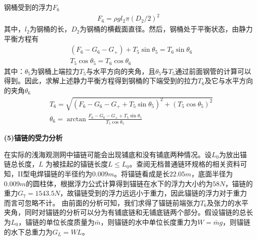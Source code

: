 \documentclass[UTF8]{ctexbook}
\theoremstyle{nonumberplain}
\begin{document}
            \par
            钢桶受到的浮力$F_6$
            \begin{align*}
            F_6 = \rho g l_2 \pi ( {D_2}/{2} ) ^2
            \end{align*}
            其中，$l_2$为钢桶的长，$D_2$为钢桶的横截面直径。然后，钢桶处于平衡状态，由静力平衡方程有
            \begin{align*}
            & (F_6 - G_6 - G_+) +T_5\sin \theta_5 = T_6\sin  \theta_6\\
            & T_5\cos\theta_5 = T_6\cos \theta_6
            \end{align*}
            其中：$\theta_5$为钢桶上端拉力$T_5$与水平方向的夹角，且$\theta_5$与$T_5$通过前面钢管的计算可以得到。因此，求解上述静力平衡方程得到钢桶的下端受到的拉力$T_6$及它与水平方向的夹角$\theta_6$
            \begin{align*}
            & T_6 = \sqrt{(F_6 - G_6 -G_+ +T_5\sin \theta_5)^2+(T_5\cos\theta_5)^2}\\
            & \theta_6 = \arctan \frac{F_6-G_6 - G_++T_5\sin \theta_5}{T_5\cos \theta_5}
            \end{align*}
            \par
            \textbf{(5)锚链的受力分析}
            \par
            在实际的浅海观测网中锚链可能会出现铺底和没有铺底两种情况。设$L_0$为放出锚链总长度，$L$ 为被挂起的锚链长度$L \leqslant L_0$。查阅无档普通链环规格的相关资料可知，II型电焊锚链的半径约为$0.009m$。将锚链看成是长$22.05m$，底面半径为$0.009m$的圆柱体，根据浮力公式计算得到锚链在水下的浮力大小约为$58N$，锚链的重力$G_7 = 1543.5N$，故锚链受到的浮力远远小于重力，因此锚链的浮力对于重力而言可忽略不计。
            由前面的分析可知，我们求得了锚链前端张力$T_6$及张力的水平夹角，同时对锚链的分析可以分为有铺底链和无铺底链两个部分。假设锚链的总长为$L_0$，锚链的单位长度质量为$\bar{m}$，则锚链的水中单位长度重力为$W = \bar{m}g$，则锚链的水下总重力为$G_L = WL$。
\end{document}
